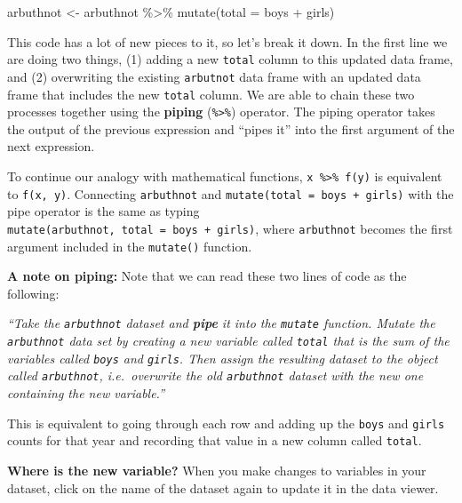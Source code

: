 \documentclass[
]{article}
\newenvironment{Shaded}{\begin{snugshade}}{\end{snugshade}}
\newcommand{\AttributeTok}[1]{\textcolor[rgb]{0.77,0.63,0.00}{#1}}
\newcommand{\FunctionTok}[1]{\textcolor[rgb]{0.00,0.00,0.00}{#1}}
\newcommand{\NormalTok}[1]{#1}
\newcommand{\OtherTok}[1]{\textcolor[rgb]{0.56,0.35,0.01}{#1}}
\newcommand{\SpecialCharTok}[1]{\textcolor[rgb]{0.00,0.00,0.00}{#1}}
\begin{document}
\begin{Shaded}
\begin{Highlighting}[]
\NormalTok{arbuthnot }\OtherTok{\textless{}{-}}\NormalTok{ arbuthnot }\SpecialCharTok{\%\textgreater{}\%}
  \FunctionTok{mutate}\NormalTok{(}\AttributeTok{total =}\NormalTok{ boys }\SpecialCharTok{+}\NormalTok{ girls)}
\end{Highlighting}
\end{Shaded}

This code has a lot of new pieces to it, so let's break it down. In the first line we are doing two things, (1) adding a new \texttt{total} column to this updated data frame, and (2) overwriting the existing \texttt{arbutnot} data frame with an updated data frame that includes the new \texttt{total} column. We are able to chain these two processes together using the \textbf{piping} (\texttt{\%\textgreater{}\%}) operator. The piping operator takes the output of the previous expression and ``pipes it'' into the first argument of the next expression.

To continue our analogy with mathematical functions, \texttt{x\ \%\textgreater{}\%\ f(y)} is equivalent to \texttt{f(x,\ y)}. Connecting \texttt{arbuthnot} and \texttt{mutate(total\ =\ boys\ +\ girls)} with the pipe operator is the same as typing \texttt{mutate(arbuthnot,\ total\ =\ boys\ +\ girls)}, where \texttt{arbuthnot} becomes the first argument included in the \texttt{mutate()} function.

\leavevmode{}%
\textbf{A note on piping:} Note that we can read these two lines of code as the following:

\emph{``Take the \texttt{arbuthnot} dataset and \textbf{pipe} it into the \texttt{mutate} function. Mutate the \texttt{arbuthnot} data set by creating a new variable called \texttt{total} that is the sum of the variables called \texttt{boys} and \texttt{girls}. Then assign the resulting dataset to the object called \texttt{arbuthnot}, i.e.~overwrite the old \texttt{arbuthnot} dataset with the new one containing the new variable.''}

This is equivalent to going through each row and adding up the \texttt{boys} and \texttt{girls} counts for that year and recording that value in a new column called \texttt{total}.

\textbf{Where is the new variable?} When you make changes to variables in your dataset, click on the name of the dataset again to update it in the data viewer.
\end{document}
